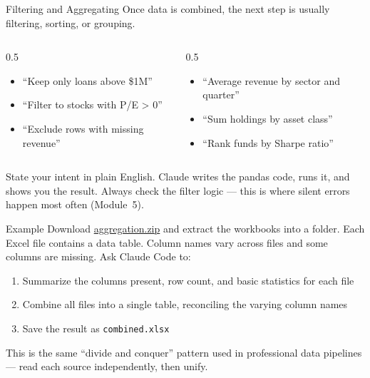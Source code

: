 \documentclass[aspectratio=169]{beamer}
\begin{document}
\begin{frame}{Filtering and Aggregating}
Once data is combined, the next step is usually filtering, sorting, or grouping.
\vspace{0.3cm}
\begin{columns}[T]
\begin{column}{0.5\textwidth}
\begin{shadedbox}[title=\textbf{Filtering}]
\begin{itemize}\small
  \item ``Keep only loans above \$1M''
  \item ``Filter to stocks with P/E > 0''
  \item ``Exclude rows with missing revenue''
\end{itemize}
\end{shadedbox}
\end{column}
\begin{column}{0.5\textwidth}
\begin{shadedbox}[title=\textbf{Aggregating}]
\begin{itemize}\small
  \item ``Average revenue by sector and quarter''
  \item ``Sum holdings by asset class''
  \item ``Rank funds by Sharpe ratio''
\end{itemize}
\end{shadedbox}
\end{column}
\end{columns}
\vspace{0.3cm}
State your intent in plain English.  Claude writes the pandas code, runs it, and shows you the result.  Always \alert{check the filter logic} --- this is where silent errors happen most often (Module~5).
\end{frame}

\begin{frame}{Example}
Download \href{https://kerryback.com/mgmt675/files/aggregation.zip}{aggregation.zip} and extract the workbooks into a folder.
\vspace{0.3cm}
Each Excel file contains a data table.  Column names vary across files and some columns are missing.  Ask Claude Code to:
\begin{enumerate}
  \item Summarize the columns present, row count, and basic statistics for each file
  \item Combine all files into a single table, reconciling the varying column names
  \item Save the result as \texttt{combined.xlsx}
\end{enumerate}
\vspace{0.3cm}
This is the same ``divide and conquer'' pattern used in professional data pipelines --- read each source independently, then unify.
\end{frame}
\end{document}
